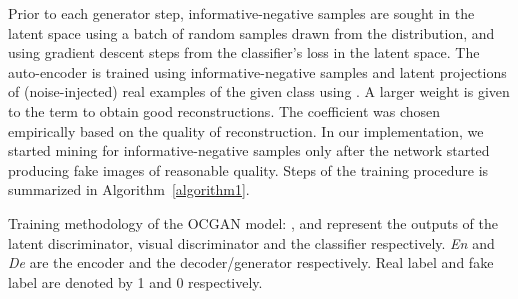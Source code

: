 \documentclass[10pt,twocolumn,letterpaper]{article}
\begin{document}
Prior to each generator step, informative-negative samples are sought in the latent space using a batch of random samples drawn from the  distribution, and using gradient descent steps from the classifier's loss in the latent space. The auto-encoder is trained using informative-negative samples and latent projections of (noise-injected) real examples of the given class using  . A larger weight is given to the  term to obtain good reconstructions. The coefficient was chosen empirically based on the quality of reconstruction. In our implementation, we started mining for informative-negative samples only after the network started producing fake images of reasonable quality. Steps of the training procedure is summarized in Algorithm~\ref{algorithm1}.




\IncMargin{1em}
\begin{algorithm}
	\caption{Training methodology of the OCGAN model: ,  and  represent the outputs of the latent discriminator, visual discriminator and the classifier respectively. {\it En} and {\it De} are the encoder and the decoder/generator respectively. Real label and fake label are denoted by 1 and 0 respectively. }\label{algorithm1}
	\BlankLine

		\end{algorithm}\DecMargin{1em}
\end{document}
